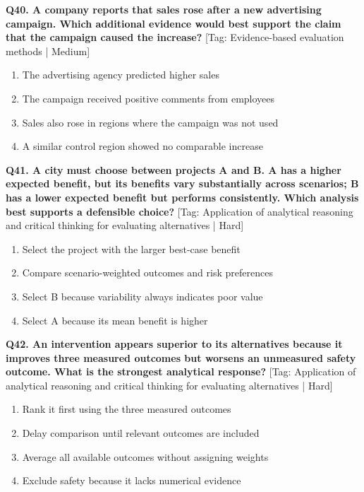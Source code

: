 \noindent\textbf{Q40. A company reports that sales rose after a new advertising campaign. Which additional evidence would best support the claim that the campaign caused the increase?} \hfill [Tag: Evidence-based evaluation methods | Medium]
\begin{enumerate}[label=(\alph*),topsep=2pt,itemsep=1pt,partopsep=0pt,parsep=0pt]
    \item {The advertising agency predicted higher sales}
    \item {The campaign received positive comments from employees}
    \item {Sales also rose in regions where the campaign was not used}
    \item {A similar control region showed no comparable increase}
\end{enumerate}
\vspace{2mm}

\noindent\textbf{Q41. A city must choose between projects A and B. A has a higher expected benefit, but its benefits vary substantially across scenarios; B has a lower expected benefit but performs consistently. Which analysis best supports a defensible choice?} \hfill [Tag: Application of analytical reasoning and critical thinking for evaluating alternatives | Hard]
\begin{enumerate}[label=(\alph*),topsep=2pt,itemsep=1pt,partopsep=0pt,parsep=0pt]
    \item {Select the project with the larger best-case benefit}
    \item {Compare scenario-weighted outcomes and risk preferences}
    \item {Select B because variability always indicates poor value}
    \item {Select A because its mean benefit is higher}
\end{enumerate}
\vspace{2mm}

\noindent\textbf{Q42. An intervention appears superior to its alternatives because it improves three measured outcomes but worsens an unmeasured safety outcome. What is the strongest analytical response?} \hfill [Tag: Application of analytical reasoning and critical thinking for evaluating alternatives | Hard]
\begin{enumerate}[label=(\alph*),topsep=2pt,itemsep=1pt,partopsep=0pt,parsep=0pt]
    \item {Rank it first using the three measured outcomes}
    \item {Delay comparison until relevant outcomes are included}
    \item {Average all available outcomes without assigning weights}
    \item {Exclude safety because it lacks numerical evidence}
\end{enumerate}
\vspace{2mm}

